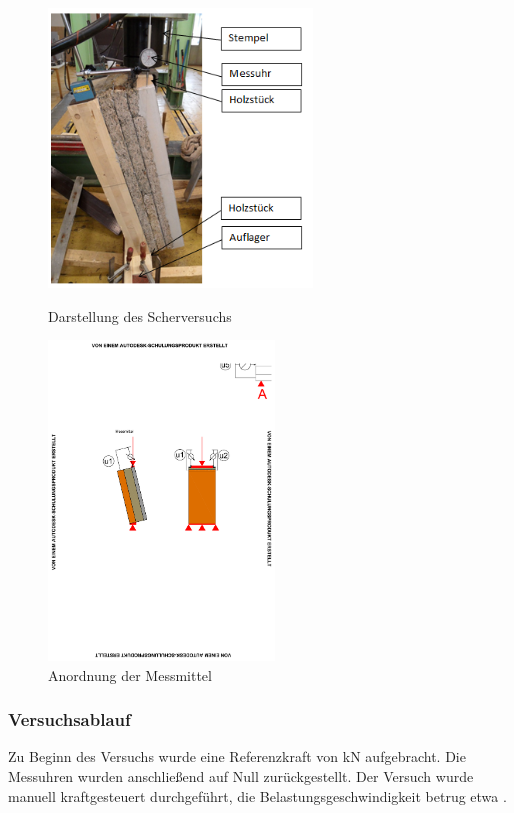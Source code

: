 \begin{figure}[h!]
\begin{minipage}[hbt]{7cm}	
	\includegraphics[width=7cm]{Auswertung/1versuch/versuchsdarstellung_scherversuch_real.png}
	\caption{Darstellung des Scherversuchs}
	\label{Darstellung des Scherversuchs}
\end{minipage}
\hfill
\begin{minipage}[hbt]{7cm}	
\begin{center}
	\includegraphics[width=6cm, trim=11cm 12cm 4cm 9cm, clip=true]{Auswertung/schubversuch/Schubversuch_Skizze.pdf}
	\end{center}
    \caption{Anordnung der Messmittel }
	\label{abb:messeinrichtung_scherversuch}
\end{minipage}
\end{figure}

\subsubsection{Versuchsablauf}
Zu Beginn des Versuchs wurde eine Referenzkraft von \unit[0,5]{kN} aufgebracht. Die Messuhren wurden anschließend auf Null zurückgestellt.
Der Versuch wurde manuell kraftgesteuert durchgeführt, die Belastungsgeschwindigkeit betrug etwa .

